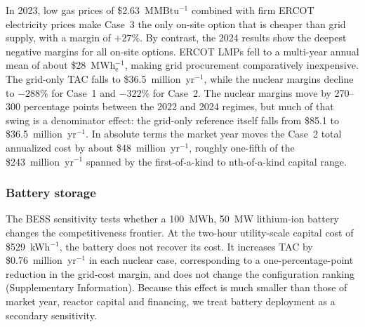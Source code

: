 \documentclass[a4paper,fleqn]{cas-sc}
\begin{document}
In 2023, low gas prices of \$2.63~MMBtu$^{-1}$ combined with firm ERCOT electricity prices make Case~3 the only on-site option that is cheaper than grid supply, with a margin of $+27\%$. By contrast, the 2024 results show the deepest negative margins for all on-site options. ERCOT LMPs fell to a multi-year annual mean of about \$28~MWh$_\mathrm{e}^{-1}$, making grid procurement comparatively inexpensive. The grid-only TAC falls to \$36.5~million~yr$^{-1}$, while the nuclear margins decline to $-288\%$ for Case~1 and $-322\%$ for Case~2. The nuclear margins move by 270--300 percentage points between the 2022 and 2024 regimes, but much of that swing is a denominator effect: the grid-only reference itself falls from \$85.1 to \$36.5~million~yr$^{-1}$. In absolute terms the market year moves the Case~2 total annualized cost by about \$48~million~yr$^{-1}$, roughly one-fifth of the \$243~million~yr$^{-1}$ spanned by the first-of-a-kind to nth-of-a-kind capital range.

\subsubsection{Battery storage}
The BESS sensitivity tests whether a 100~MWh, 50~MW lithium-ion battery changes the competitiveness frontier. At the two-hour utility-scale capital cost of \$529~kWh$^{-1}$, the battery does not recover its cost. It increases TAC by \$0.76~million~yr$^{-1}$ in each nuclear case, corresponding to a one-percentage-point reduction in the grid-cost margin, and does not change the configuration ranking (Supplementary Information). Because this effect is much smaller than those of market year, reactor capital and financing, we treat battery deployment as a secondary sensitivity.
\end{document}
